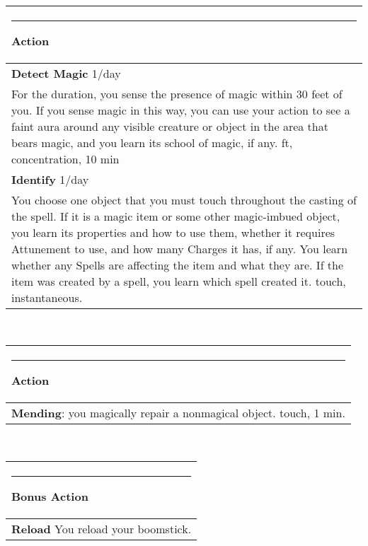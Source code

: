 \documentclass[twocolumn]{article}
\begin{document}
\\
\noindent\begin{tabular}{|m{3.1in}|}
\hline
\rule{1.25in}{0pt}Action\\
\hline
\textbf{Detect Magic} 1/day\\
For the duration, you sense the presence of magic within 30 feet of you. If you sense magic in this way, you can use your action to see a faint aura around any visible creature or object in the area that bears magic, and you learn its school of magic, if any.  {\sc 30 ft, concentration, 10 min}\\
\textbf{Identify} 1/day\\
You choose one object that you must touch throughout the casting of the spell. If it is a magic item or some other magic-imbued object, you learn its properties and how to use them, whether it requires Attunement to use, and how many Charges it has, if any. You learn whether any Spells are affecting the item and what they are. If the item was created by a spell, you learn which spell created it. {\sc touch, instantaneous}.\\
\hline
\end{tabular}
\vspace{8pt}

\\
\noindent\begin{tabular}{|m{3.1in}|}
\hline
\rule{1.25in}{0pt}Action\\
\hline
\textbf{Mending}: you magically repair a nonmagical object. {\sc touch, 1 min.}\\
\hline
\end{tabular}
\vspace{8pt}

\\
\noindent\begin{tabular}{|m{3.1in}|}
\hline
\rule{1.25in}{0pt}Bonus Action\\
\hline
\textbf{Reload} You reload your boomstick. \\
\hline
\end{tabular}
\end{document}
